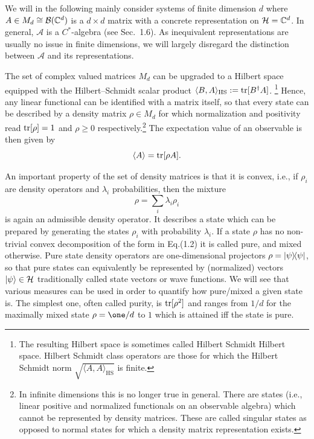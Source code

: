 \documentclass[11pt,a4paper]{article}
\theoremstyle{plain}
\theoremstyle{definition}
\theoremstyle{remark}
\numberwithin{equation}{section}
\begin{document}
We will in the following mainly consider systems of finite dimension $d$ where $A\in M_d \cong \mathcal{B}(\mathbb{C}^d)$ is a $d\times d$ matrix with a concrete representation on $\mathcal{H}=\mathbb{C}^d$. In general, $\mathcal{A}$ is a $C^\ast$-algebra (see Sec.~1.6). As inequivalent representations are usually no issue in finite dimensions, we will largely disregard the distinction between $\mathcal{A}$ and its representations.

The set of complex valued matrices $M_d$ can be upgraded to a Hilbert space equipped with the Hilbert--Schmidt scalar product $\langle B,A\rangle_{\mathrm{HS}} := \operatorname{tr}[B^\dagger A]$.%
\footnote{The resulting Hilbert space is sometimes called Hilbert Schmidt Hilbert space. Hilbert Schmidt class operators are those for which the Hilbert Schmidt norm $\sqrt{\langle A,A\rangle_{\mathrm{HS}}}$ is finite.}
Hence, any linear functional can be identified with a matrix itself, so that every state can be described by a density matrix $\rho\in M_d$ for which normalization and positivity read $\operatorname{tr}[\rho]=1$ and $\rho\ge 0$ respectively.\footnote{In infinite dimensions this is no longer true in general. There are states (i.e., linear positive and normalized functionals on an observable algebra) which cannot be represented by density matrices. These are called singular states as opposed to normal states for which a density matrix representation exists.}
The expectation value of an observable is then given by
\begin{equation}
    \langle A\rangle = \operatorname{tr}[\rho A].
\end{equation}

An important property of the set of density matrices is that it is convex, i.e., if $\rho_i$ are density operators and $\lambda_i$ probabilities, then the mixture
\begin{equation}
    \rho = \sum_i \lambda_i \rho_i
\end{equation}
is again an admissible density operator. It describes a state which can be prepared by generating the states $\rho_i$ with probability $\lambda_i$. If a state $\rho$ has no non-trivial convex decomposition of the form in Eq.(1.2) it is called pure, and mixed otherwise. Pure state density operators are one-dimensional projectors $\rho=|\psi\rangle\!\langle\psi|$, so that pure states can equivalently be represented by (normalized) vectors $|\psi\rangle\in \mathcal{H}$ traditionally called state vectors or wave functions. We will see that various measures can be used in order to quantify how pure/mixed a given state is. The simplest one, often called purity, is $\operatorname{tr}[\rho^2]$ and ranges from $1/d$ for the maximally mixed state $\rho=\one/d$ to $1$ which is attained iff the state is pure.
\end{document}
